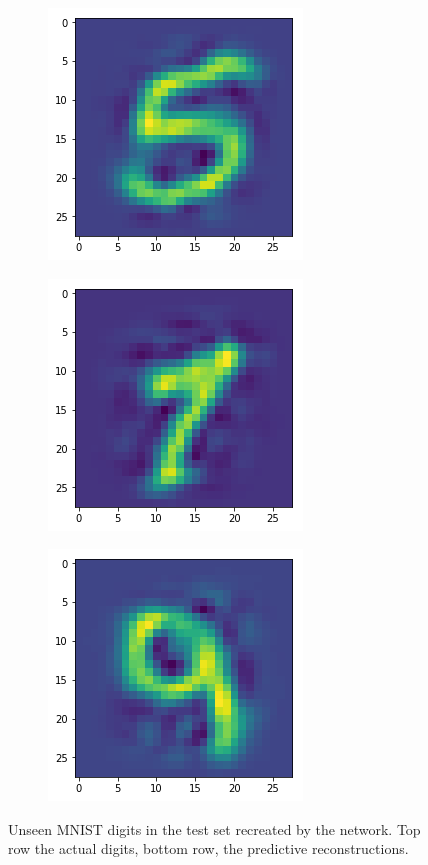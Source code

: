\begin{figure}[H]
\bigskip
\begin{subfigure}{.3\linewidth}
 \centering
 \includegraphics[scale=0.4]{chapter_3_figures/unseen_test_5.png}
\end{subfigure}
 \hfill
\begin{subfigure}{.3\linewidth}
 \centering
 \includegraphics[scale=0.4]{chapter_3_figures/unseen_test_7.png}
\end{subfigure}
 \hfill
\begin{subfigure}{.3\linewidth}
 \centering
 \includegraphics[scale=0.4]{chapter_3_figures/unseen_test_9.png}
\end{subfigure}
\caption{Unseen MNIST digits in the test set recreated by the network. Top row the actual digits, bottom row, the predictive reconstructions.}
\end{figure}

